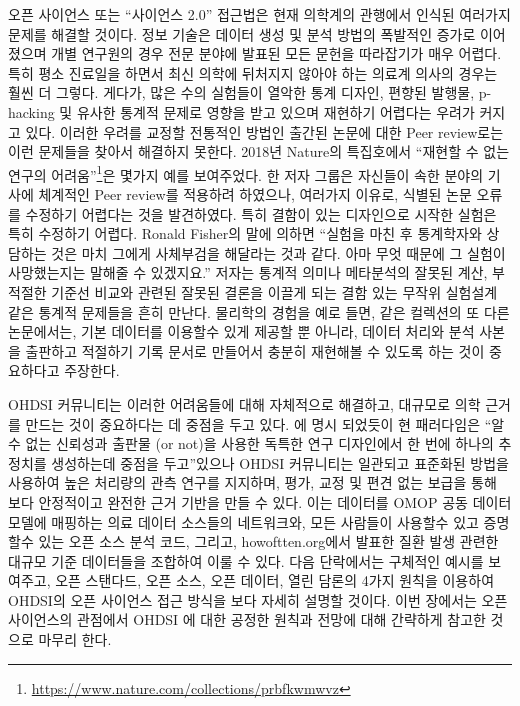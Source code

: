 \documentclass[11pt]{book}
\let\rmarkdownfootnote\footnote%
\def\footnote{\protect\rmarkdownfootnote}
\theoremstyle{definition}
\theoremstyle{definition}
\theoremstyle{definition}
\theoremstyle{remark}
\begin{document}
오픈 사이언스 또는 ``사이언스 2.0'' \citep{wiki:Science_2.0} 접근법은
현재 의학계의 관행에서 인식된 여러가지 문제를 해결할 것이다. 정보 기술은
데이터 생성 및 분석 방법의 폭발적인 증가로 이어졌으며 개별 연구원의 경우
전문 분야에 발표된 모든 문헌을 따라잡기가 매우 어렵다. 특히 평소
진료일을 하면서 최신 의학에 뒤처지지 않아야 하는 의료계 의사의 경우는
훨씬 더 그렇다. 게다가, 많은 수의 실험들이 열악한 통계 디자인, 편향된
발행물, p-hacking 및 유사한 통계적 문제로 영향을 받고 있으며 재현하기
어렵다는 우려가 커지고 있다. 이러한 우려를 교정할 전통적인 방법인 출간된
논문에 대한 Peer review로는 이런 문제들을 찾아서 해결하지 못한다. 2018년
Nature의 특집호에서 ``재현할 수 없는 연구의 어려움''\footnote{\url{https://www.nature.com/collections/prbfkwmwvz}}은
몇가지 예를 보여주었다. 한 저자 그룹은 자신들이 속한 분야의 기사에
체계적인 Peer review를 적용하려 하였으나, 여러가지 이유로, 식별된 논문
오류를 수정하기 어렵다는 것을 발견하였다. 특히 결함이 있는 디자인으로
시작한 실험은 특히 수정하기 어렵다. Ronald Fisher의 말에 의하면 ``실험을
마친 후 통계학자와 상담하는 것은 마치 그에게 사체부검을 해달라는 것과
같다. 아마 무엇 때문에 그 실험이 사망했는지는 말해줄 수 있겠지요.''
\citep{wikiquote:Ronald_Fisher} 저자는 통계적 의미나 메타분석의 잘못된
계산, 부적절한 기준선 비교와 관련된 잘못된 결론을 이끌게 되는 결함 있는
무작위 실험설계 같은 통계적 문제들을 흔히 만난다. \citep{allison_2016}
물리학의 경험을 예로 들면, 같은 컬렉션의 또 다른 논문에서는, 기본
데이터를 이용할수 있게 제공할 뿐 아니라, 데이터 처리와 분석 사본을
출판하고 적절하기 기록 문서로 만들어서 충분히 재현해볼 수 있도록 하는
것이 중요하다고 주장한다.\citep{Chen2018}

OHDSI 커뮤니티는 이러한 어려움들에 대해 자체적으로 해결하고, 대규모로
의학 근거를 만드는 것이 중요하다는 데 중점을 두고 있다.
\citet{schuemie_2018b} 에 명시 되었듯이 현 패러다임은 ``알 수 없는
신뢰성과 출판물 (or not)을 사용한 독특한 연구 디자인에서 한 번에 하나의
추정치를 생성하는데 중점을 두고''있으나 OHDSI 커뮤니티는 일관되고
표준화된 방법을 사용하여 높은 처리량의 관측 연구를 지지하며, 평가, 교정
및 편견 없는 보급을 통해 보다 안정적이고 완전한 근거 기반을 만들 수
있다. 이는 데이터를 OMOP 공동 데이터 모델에 매핑하는 의료 데이터
소스들의 네트워크와, 모든 사람들이 사용할수 있고 증명할수 있는 오픈 소스
분석 코드, 그리고, howoftten.org에서 발표한 질환 발생 관련한 대규모 기준
데이터들을 조합하여 이룰 수 있다. 다음 단락에서는 구체적인 예시를
보여주고, 오픈 스탠다드, 오픈 소스, 오픈 데이터, 열린 담론의 4가지
원칙을 이용하여 OHDSI의 오픈 사이언스 접근 방식을 보다 자세히 설명할
것이다. 이번 장에서는 오픈 사이언스의 관점에서 OHDSI 에 대한 공정한
원칙과 전망에 대해 간략하게 참고한 것으로 마무리 한다.
\end{document}
